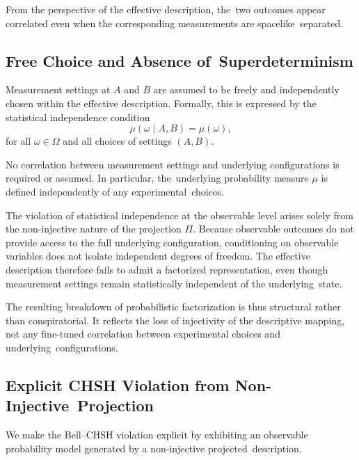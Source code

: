 \documentclass[quantumrep,article,accept,pdftex,oneauthor]{Definitions/mdpi}
\theoremstyle{remark}
\begin{document}
    From the perspective of the effective description, the~two outcomes appear correlated
    even when the corresponding measurements are spacelike~separated.

  \subsection[\appendixname~\thesubsection]{Free Choice and Absence of~Superdeterminism}
    \label{subsec:free-choice-and-absence-of-superdeterminism}

    Measurement settings at $A$ and $B$ are assumed to be freely and independently
    chosen within the effective description.
    Formally, this is expressed by the statistical independence condition
    \[
      \mu(\omega \mid A,B) = \mu(\omega),
    \]
    for all $\omega \in \Omega$ and all choices of settings $(A,B)$.

    No correlation between measurement settings and underlying configurations is
    required or assumed.
    In particular, the~underlying probability measure $\mu$ is defined independently
    of any experimental~choices.

    The violation of statistical independence at the observable level arises solely
    from the non-injective nature of the projection $\Pi$.
    Because observable outcomes do not provide access to the full underlying
    configuration, conditioning on observable variables does not isolate independent
    degrees of freedom.
    The effective description therefore fails to admit a factorized representation,
    even though measurement settings remain statistically independent of the
    underlying~state.

    The resulting breakdown of probabilistic factorization is thus structural rather
    than conspiratorial.
    It reflects the loss of injectivity of the descriptive mapping, not any
    fine-tuned correlation between experimental choices and underlying~configurations.

 \subsection[\appendixname~\thesubsection]{Explicit CHSH Violation from Non-Injective~Projection}
    \label{subsec:explicit-chsh-violation-from-non-injective-projection}

    We make the Bell--CHSH violation explicit by exhibiting an observable probability
    model generated by a non-injective projected~description.
\end{document}
